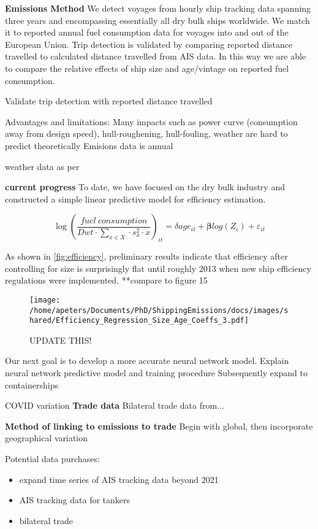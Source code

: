 \documentclass[hidelinks, 12pt,letterpaper]{article}
\begin{document}
\textbf{Emissions Method}
We detect voyages from hourly ship tracking data spanning three years and encompassing essentially all dry bulk ships worldwide. We match it to reported annual fuel consumption data for voyages into and out of the European Union. 
Trip detection is validated by comparing reported distance travelled to calculated distance travelled from AIS data. 
In this way we are able to compare the relative effects of ship size and age/vintage on reported fuel consumption. 

Validate trip detection with reported distance travelled


Advantages and limitations:
Many impacts such as power curve (consumption away from design speed), hull-roughening, hull-fouling, weather are hard to predict theoretically \citep{olmer2017greenhouse}
Emisions data is annual 

weather data as per \citet{brancaccio2020geography}

\textbf{current progress}
To date, we have focused on the dry bulk industry and constructed a simple linear predictive model for efficiency estimation. 

\begin{equation}
\log\left(
    \frac{fuel~consumption}{Dwt \cdot \sum_{x \in X}  \cdot s_x^2 \cdot x}
\right)_{it}    
        = \delta age_{it} + \boldsymbol{\beta}log(Z_i) + \varepsilon_{it}
\end{equation}

As shown in \autoref{fig:efficiency}, preliminary results indicate that efficiency after controlling for size is surprisingly flat until roughly 2013 when new ship efficiency regulations were implemented. 
**compare to \citep{faber2015historical} figure 15


\begin{figure}[h]
  \centering
  \texttt{[image: /home/apeters/Documents/PhD/ShippingEmissions/docs/images/shared/Efficiency\_Regression\_Size\_Age\_Coeffs\_3.pdf]}
  \caption{UPDATE THIS!}
  \label{fig:efficiency}
\end{figure}

Our next goal is to develop a more accurate neural network model. Explain neural network predictive model and training procedure
Subsequently expand to containerships

COVID variation
\textbf{Trade data} Bilateral trade data from...

\textbf{Method of linking to emissions to trade}
Begin with global, then incorporate geographical variation


\pagebreak
Potential data purchases:
\begin{itemize}
  \item expand time series of AIS tracking data beyond 2021
  \item AIS tracking data for tankers
  \item bilateral trade
\end{itemize}

\pagebreak
  
\singlespace{

}

 
\end{document}
